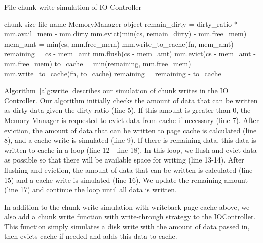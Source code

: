 \documentclass[conference]{IEEEtran}
\newcommand{\Desc}[2]{\State \makebox[2em][l]{#1}#2}
\begin{document}
    \begin{algorithm}\caption{File chunk write simulation of IO Controller}
    \label{alg:write}
        \small
        \begin{algorithmic}[1]
            \Input
                \Desc{cs}{chunk size}
                \Desc{fn}{file name}
                \Desc{mm}{MemoryManager object}
               \EndInput
            \State remain\_dirty = dirty\_ratio * mm.avail\_mem - mm.dirty
             
                \State mm.evict(min(cs, remain\_dirty) - mm.free\_mem)
                \State mem\_amt = min(cs, mm.free\_mem)
                \State mm.write\_to\_cache(fn, mem\_amt) 
            \EndIf
            \State remaining = cs - mem\_amt
              
                \State mm.flush(cs - mem\_amt)
                \State mm.evict(cs - mem\_amt  - mm.free\_mem) 
                \State to\_cache = min(remaining, mm.free\_mem)
                \State mm.write\_to\_cache(fn, to\_cache) 
                \State remaining = remaining - to\_cache
            \EndWhile
            
        \end{algorithmic}
    \end{algorithm}
    Algorithm~\ref{alg:write} describes our simulation of chunk writes in 
    the IO Controller. 
    Our algorithm initially checks the  amount of data that 
    can be written as dirty data given the dirty ratio (line 5).
    If this amount is greater than 0, the Memory Manager is requested to evict 
    data from cache if necessary (line 7).
    After eviction, the amount of data that can be written to 
    page cache is calculated (line 8), and a cache write is simulated (line 9). 
    If there is remaining data, this data is written to cache in a loop (line 12 - line 18).
    In this loop, we flush and evict data as possible so that there will be 
    available space for writing (line 13-14).  
    After flushing and eviction, the amount of data that can be written 
    is calculated (line 15) and a cache write is simulated (line 16). 
    We update the remaining amount (line 17) and continue the loop until all data 
    is written.

    In addition to the chunk write simulation with writeback page cache above, 
    we also add a chunk write function with write-through strategy to the IOController.
    This function simply simulates a disk write with the amount of data passed in, 
    then evicts cache if needed and adds this data to cache. 
    
\end{document}
